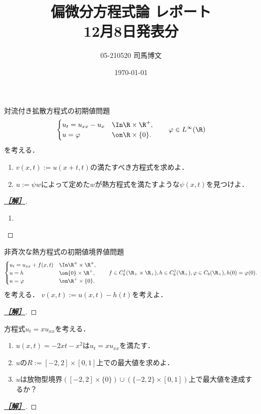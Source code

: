 \documentclass[uplatex,dvipdfmx]{jsarticle}
\title{偏微分方程式論 レポート\\12月8日発表分}\author{05-210520 司馬博文}\date{\today}
\begin{document}
\setcounter{section}{1}

\begin{problem}
    対流付き拡散方程式の初期値問題
    \[\begin{cases}
        u_t=u_{xx}-u_x&\In\R\times\R^+,\\
        u=\varphi&\on\R\times\{0\}.
    \end{cases}\qquad \varphi\in L^\infty(\R)\]
    を考える．
    \begin{enumerate}
        \item $v(x,t):=u(x+t,t)$の満たすべき方程式を求めよ．
        \item $u:=\psi w$によって定めた$w$が熱方程式を満たすような$\psi(x,t)$を見つけよ．
    \end{enumerate}
\end{problem}
\begin{proof}[\bf\underline{［解］}]\mbox{}
    \begin{enumerate}
        \item 
    \end{enumerate}
\end{proof}

\begin{problem}
    非斉次な熱方程式の初期値境界値問題
    \[\begin{cases}
        u_t=u_{xx}+f(x,t)&\In\R^+\times\R^+,\\
        u=h&\on\{0\}\times\R^+,\\
        u=\varphi&\on\R^+\times\{0\}.
    \end{cases}\qquad f\in C^1_b(\R_+\times\R_+),h\in C^1_b(\R_+),\varphi\in C_b(\R_+),h(0)=\varphi(0).\]
    を考える．
    $v(x,t):=u(x,t)-h(t)$を考えよ．
\end{problem}
\begin{proof}[\bf\underline{［解］}]
    
\end{proof}

\begin{problem}
    方程式$u_t=xu_{xx}$を考える．
    \begin{enumerate}
        \item $u(x,t)=-2xt-x^2$は$u_t=xu_{xx}$を満たす．
        \item $u$の$R:=[-2,2]\times[0,1]$上での最大値を求めよ．
        \item $u$は放物型境界$([-2,2]\times\{0\})\cup(\{-2,2\}\times[0,1])$上で最大値を達成するか？
    \end{enumerate}
\end{problem}
\begin{proof}[\bf\underline{［解］}]
    
\end{proof}
\end{document}
